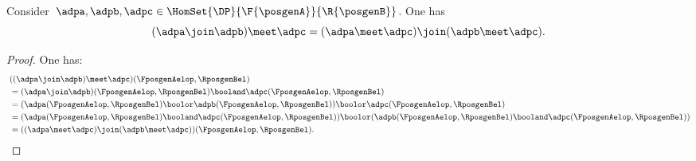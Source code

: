 \begin{lemma}
    \label{lem:wedge_vee}
    Consider~$\adpa,\adpb,\adpc\in \HomSet{\DP}{\F{\posgenA}}{\R{\posgenB}}$.
    One has
    \begin{equation*}
        (\adpa \join \adpb)
        \meet \adpc=(\adpa \meet \adpc) \join (\adpb\meet \adpc).
    \end{equation*}
\end{lemma}
\begin{proof}
    One has:
    \begin{equation*}
        \begin{aligned}
            ~ & ((\adpa \join \adpb)\meet \adpc)(\FposgenAelop,\RposgenBel)                                                                                                        \\
              & = (\adpa \join \adpb)(\FposgenAelop,\RposgenBel)\booland \adpc(\FposgenAelop,\RposgenBel)                                                                          \\
              & =(\adpa(\FposgenAelop,\RposgenBel) \boolor \adpb(\FposgenAelop,\RposgenBel))\boolor \adpc(\FposgenAelop,\RposgenBel)                                               \\
              & =(\adpa(\FposgenAelop,\RposgenBel) \booland  \adpc(\FposgenAelop,\RposgenBel)) \boolor (\adpb(\FposgenAelop,\RposgenBel)\booland \adpc(\FposgenAelop,\RposgenBel)) \\
              & =((\adpa \meet \adpc) \join (\adpb\meet \adpc))(\FposgenAelop,\RposgenBel).
        \end{aligned}
    \end{equation*}
\end{proof}

